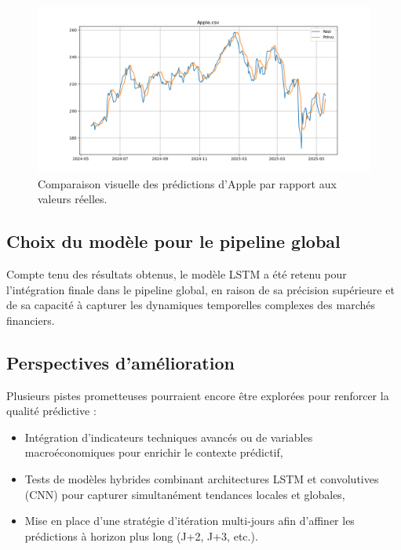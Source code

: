 \documentclass[a4paper,12pt]{article}
\begin{document}
\begin{figure}[h!]
    \centering
    \includegraphics[width=\textwidth]{Apple copy.png}
    \caption{Comparaison visuelle des prédictions d'Apple par rapport aux valeurs réelles.}
    \label{fig:regression_comparison}
\end{figure}

\subsection*{Choix du modèle pour le pipeline global}

Compte tenu des résultats obtenus, le modèle LSTM a été retenu pour l'intégration finale dans le pipeline global, en raison de sa précision supérieure et de sa capacité à capturer les dynamiques temporelles complexes des marchés financiers.

\subsection*{Perspectives d’amélioration}

Plusieurs pistes prometteuses pourraient encore être explorées pour renforcer la qualité prédictive :

\begin{itemize}
    \item Intégration d'indicateurs techniques avancés ou de variables macroéconomiques pour enrichir le contexte prédictif,
    \item Tests de modèles hybrides combinant architectures LSTM et convolutives (CNN) pour capturer simultanément tendances locales et globales,
    \item Mise en place d'une stratégie d’itération multi-jours afin d’affiner les prédictions à horizon plus long (J+2, J+3, etc.).
\end{itemize}
\end{document}
